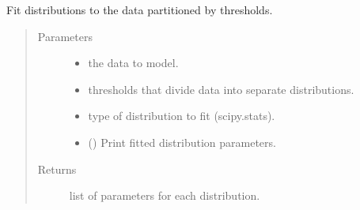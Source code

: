 \documentclass[letterpaper,10pt,english]{sphinxmanual}
\begin{document}
\begin{fulllineitems}
\label{\detokenize{tes:tes.analysis.hard_maximisation}}
\sphinxAtStartPar
Fit distributions to the data partitioned by thresholds.
\begin{quote}\begin{description}
\item[{Parameters}] \leavevmode\begin{itemize}
\item {} 
\sphinxAtStartPar
{} \textendash{} the data to model.

\item {} 
\sphinxAtStartPar
{} \textendash{} thresholds that divide data into separate distributions.

\item {} 
\sphinxAtStartPar
{} \textendash{} type of distribution to fit (scipy.stats).

\item {} 
\sphinxAtStartPar
{} () \textendash{} Print fitted distribution parameters.

\end{itemize}

\item[{Returns}] \leavevmode
\sphinxAtStartPar
list of parameters for each distribution.

\end{description}\end{quote}

\end{fulllineitems}

\end{document}
